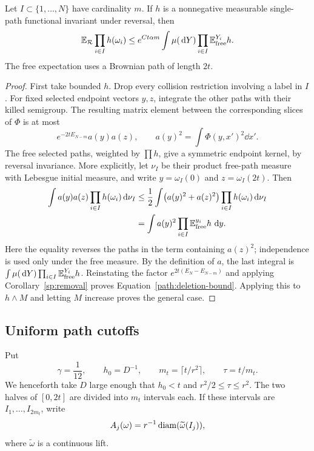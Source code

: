 \begin{lemma}\label{path:deletion}
Let $I\subset\{1,\ldots,N\}$ have cardinality $m$.  If $h$ is a
nonnegative measurable single-path functional invariant under reversal,
then
\begin{equation}\label{path:deletion-bound}
 \mathbb E_{\mathcal R}\prod_{i\in I}h(\omega_i)
 \le e^{Ct\alpha m}
       \int\mu(\,\mathrm d Y)\prod_{i\in I}\mathbb E^{Y_i}_{\rm free}h.
\end{equation}
The free expectation uses a Brownian path of length $2t$.
\end{lemma}

\begin{proof}
First take bounded $h$.  Drop every collision restriction involving a
label in $I$.  For fixed selected endpoint vectors $y,z$, integrate
the other paths with their killed semigroup.  The resulting matrix
element between the corresponding slices of $\Phi$ is at most
\[
 e^{-2tE_{N-m}}a(y)a(z),\qquad
 a(y)^2=\int\Phi(y,x')^2\dd x'.
\]
The free selected paths, weighted by $\prod h$, give a symmetric
endpoint kernel, by reversal invariance.  More explicitly, let $\nu_I$
be their product free-path measure with Lebesgue initial measure, and
write $y=\omega_I(0)$ and $z=\omega_I(2t)$.  Then
\begin{align*}
 \int a(y)a(z)\prod_{i\in I}h(\omega_i)\,\mathrm d\nu_I
 &\le\frac12\int\bigl(a(y)^2+a(z)^2\bigr)
                       \prod_{i\in I}h(\omega_i)\,\mathrm d\nu_I\\
 &=\int a(y)^2\prod_{i\in I}\mathbb E_{\rm free}^{y_i}h\,\,\mathrm d y.
\end{align*}
Here the equality reverses the paths in the term containing $a(z)^2$;
independence is used only under the free measure.  By the definition of
$a$, the last integral is
$\int\mu(\,\mathrm d Y)\prod_{i\in I}\mathbb E_{\rm free}^{Y_i}h$.
Reinstating the factor $e^{2t(E_N-E_{N-m})}$ and applying
Corollary~\ref{sp:removal} proves Equation~\eqref{path:deletion-bound}.
Applying this to $h\wedge M$
and letting $M$ increase proves the general case.
\end{proof}

\subsection{Uniform path cutoffs}

Put
\begin{equation}\label{path:cutoff-parameters}
 \gamma=\frac1{12},\qquad h_0=D^{-1},\qquad
 m_t=\lceil t/r^2\rceil,\qquad \tau=t/m_t.
\end{equation}
We henceforth take $D$ large enough that $h_0<t$ and
$r^2/2\le\tau\le r^2$.  The two halves of $[0,2t]$ are divided into
$m_t$ intervals each.  If these intervals are $I_1,\ldots,I_{2m_t}$,
write
\[
 A_j(\omega)=r^{-1}\operatorname{diam}(\widetilde\omega(I_j)),
\]
where $\widetilde\omega$ is a continuous lift.

